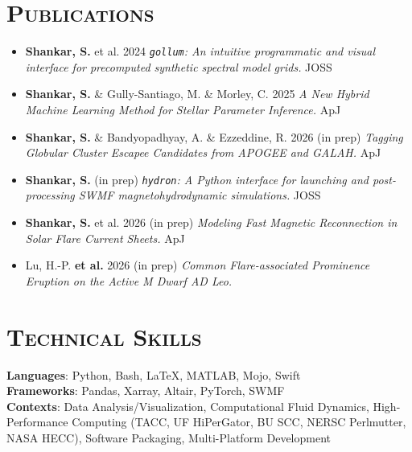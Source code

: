 \documentclass[11pt]{article}
\begin{document}
\section{\textsc{Publications}}
\begin{itemize}[itemsep=-3pt, parsep=3pt, label={--}]
    \item \textbf{Shankar, S.} et al. 2024
    \textit{\texttt{gollum}: An intuitive programmatic and visual interface for precomputed synthetic spectral model grids.} JOSS
    \item \textbf{Shankar, S.} \& Gully-Santiago, M. \& Morley, C. 2025
    \textit{A New Hybrid Machine Learning Method for Stellar Parameter Inference.} ApJ
    \item \textbf{Shankar, S.} \& Bandyopadhyay, A. \& Ezzeddine, R. 2026 (in prep)
    \textit{Tagging Globular Cluster Escapee Candidates from APOGEE and GALAH.} ApJ
    \item \textbf{Shankar, S.} (in prep)
    \textit{\texttt{hydron}: A Python interface for launching and post-processing SWMF magnetohydrodynamic simulations.} JOSS
    \item \textbf{Shankar, S.} et al. 2026 (in prep)
    \textit{Modeling Fast Magnetic Reconnection in Solar Flare Current Sheets.} ApJ
    \item Lu, H.-P. \textbf{et al.} 2026 (in prep)
    \textit{Common Flare-associated Prominence Eruption on the Active M Dwarf AD Leo.}
\end{itemize}

\section{\textsc{Technical Skills}}
\textbf{Languages}: Python, Bash, \LaTeX, MATLAB, Mojo, Swift
\\\textbf{Frameworks}: Pandas, Xarray, Altair, PyTorch, SWMF
\\\textbf{Contexts}: Data Analysis/Visualization, Computational Fluid Dynamics, High-Performance Computing (TACC, UF HiPerGator, BU SCC, NERSC Perlmutter, NASA HECC), Software Packaging, Multi-Platform Development
\end{document}
